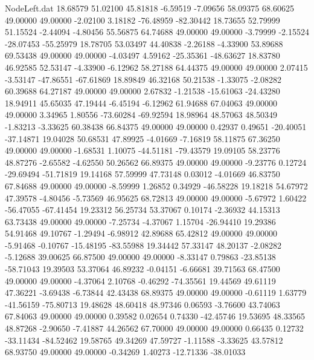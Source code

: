\begin{filecontents}{NodeLeft.dat}
  18.68579   51.02100   45.81818    -6.59519   -7.09656   58.09375   68.60625   49.00000   49.00000   -2.02100    3.18182  -76.48959  -82.30442
  18.73655   52.79999   51.15524    -2.44094   -4.80456   55.56875   64.74688   49.00000   49.00000   -3.79999   -2.15524  -28.07453  -55.25979
  18.78705   53.03497   44.40838    -2.26188   -4.33900   53.89688   69.53438   49.00000   49.00000   -4.03497    4.59162  -25.35361  -48.63627
  18.83780   46.92585   52.53147    -4.33900   -6.12962   58.27188   64.44375   49.00000   49.00000    2.07415   -3.53147  -47.86551  -67.61869
  18.89849   46.32168   50.21538    -1.33075   -2.08282   60.39688   64.27187   49.00000   49.00000    2.67832   -1.21538  -15.61063  -24.43280
  18.94911   45.65035   47.19444    -6.45194   -6.12962   61.94688   67.04063   49.00000   49.00000    3.34965    1.80556  -73.60284  -69.92594
  18.98964   48.57063   48.50349    -1.83213   -3.33625   60.38438   66.84375   49.00000   49.00000    0.42937    0.49651  -20.40051  -37.14871
  19.04028   50.68531   47.89925    -4.01669   -7.16819   58.11875   67.36250   49.00000   49.00000   -1.68531    1.10075  -44.51181  -79.43579
  19.09105   58.23776   48.87276    -2.65582   -4.62550   50.26562   66.89375   49.00000   49.00000   -9.23776    0.12724  -29.69494  -51.71819
  19.14168   57.59999   47.73148     0.03012   -4.01669   46.83750   67.84688   49.00000   49.00000   -8.59999    1.26852    0.34929  -46.58228
  19.18218   54.67972   47.39578    -4.80456   -5.73569   46.95625   68.72813   49.00000   49.00000   -5.67972    1.60422  -56.47055  -67.41454
  19.23312   56.25734   53.37067     0.10174   -2.36932   44.15313   63.73438   49.00000   49.00000   -7.25734   -4.37067    1.15704  -26.94410
  19.29386   54.91468   49.10767    -1.29494   -6.98912   42.89688   65.42812   49.00000   49.00000   -5.91468   -0.10767  -15.48195  -83.55988
  19.34442   57.33147   48.20137    -2.08282   -5.12688   39.00625   66.87500   49.00000   49.00000   -8.33147    0.79863  -23.85138  -58.71043
  19.39503   53.37064   46.89232    -0.04151   -6.66681   39.71563   68.47500   49.00000   49.00000   -4.37064    2.10768   -0.46292  -74.35561
  19.44569   49.61119   47.36221    -3.69438   -6.73844   42.43438   68.89375   49.00000   49.00000   -0.61119    1.63779  -41.56159  -75.80713
  19.48628   48.60418   48.97346     0.06593   -3.76600   43.74063   67.84063   49.00000   49.00000    0.39582    0.02654    0.74330  -42.45746
  19.53695   48.33565   48.87268    -2.90650   -7.41887   44.26562   67.70000   49.00000   49.00000    0.66435    0.12732  -33.11434  -84.52462
  19.58765   49.34269   47.59727    -1.11588   -3.33625   43.57812   68.93750   49.00000   49.00000   -0.34269    1.40273  -12.71336  -38.01033

\end{filecontents}
